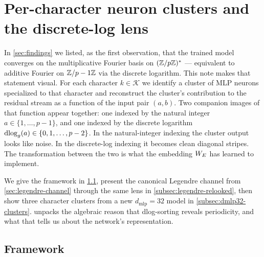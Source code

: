 \section{Per-character neuron clusters and the discrete-log lens}
\label{sec:character-clusters}

In \cref{sec:findings} we listed, as the first observation, that the
trained model converges on the multiplicative Fourier basis on
$(\mathbb{Z}/p\mathbb{Z})^*$ --- equivalent to additive Fourier on $\mathbb{Z}/p-1\mathbb{Z}$ via the
discrete logarithm.  This note makes that statement visual.  For each
character $k \in \mathcal{K}$ we identify a cluster of MLP neurons
specialized to that character and reconstruct the cluster's contribution
to the residual stream as a function of the input pair $(a, b)$.  Two
companion images of that function appear together: one indexed by the
natural integer $a \in \{1, \ldots, p-1\}$, and one indexed by the
discrete logarithm $\operatorname{dlog}_g(a) \in \{0, 1, \ldots, p-2\}$.  In the
natural-integer indexing the cluster output looks like noise.  In the
discrete-log indexing it becomes clean diagonal stripes.  The
transformation between the two is what the embedding $W_E$ has learned to
implement.

We give the framework in \cref{subsec:cluster-framework},
present the canonical Legendre channel from \cref{sec:legendre-channel}
through the same lens in \cref{subsec:legendre-relooked}, then show three
character clusters from a new $d_{\text{mlp}} = 32$ model in
\cref{subsec:dmlp32-clusters}.   unpacks the
algebraic reason that dlog-sorting reveals periodicity, and what that
tells us about the network's representation.

\subsection{Framework}
\label{subsec:cluster-framework}

